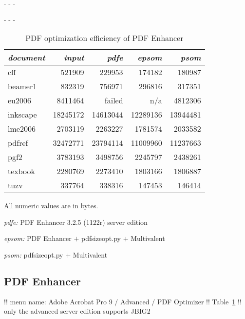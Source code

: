 \documentclass{ltugproc}
\def\cmd{\textsf}
\def\captiontop#1{%
  \advance\abovecaptionskip-\belowcaptionskip
  \advance\belowcaptionskip\abovecaptionskip
  \advance\abovecaptionskip-\belowcaptionskip
  \abovecaptionskip-\abovecaptionskip
  \caption{#1}%
  \advance\abovecaptionskip-\belowcaptionskip
  \advance\belowcaptionskip\abovecaptionskip
  \advance\abovecaptionskip-\belowcaptionskip
  \abovecaptionskip-\abovecaptionskip
}
\begin{document}
\begin{table}
\captiontop{PDF optimization efficiency
of PDF Enhancer}\label{tab:eff-pdfe}
\par\small\noindent\hfil
\advance\tabcolsep-2pt  %
\begin{tabular}{@{}lrrrr@{}}
\toprule
\emph{document} & \emph{input} & \emph{pdfe} & \emph{epsom} & \emph{psom} \\\midrule
cff         &   521909 &   229953 &   174182 &   180987 \\
beamer1     &   832319 &   756971 &   296816 &   317351 \\
eu2006      &  8411464 &  failed  & n/a      &  4812306 \\
inkscape    & 18245172 & 14613044 & 12289136 & 13944481 \\
lme2006     &  2703119 &  2263227 &  1781574 &  2033582 \\
pdfref      & 32472771 & 23794114 & 11009960 & 11237663 \\
pgf2        &  3783193 &  3498756 &  2245797 &  2438261 \\
texbook     &  2280769 &  2273410 &  1803166 &  1806887 \\
tuzv        &   337764 &   338316 &   147453 &   146414 \\
\bottomrule
\end{tabular}
\par\bigskip
\par\noindent All numeric values are in bytes.
\par\noindent\emph{pdfe:} PDF Enhancer 3.2.5 (1122r) server edition
\par\noindent\emph{epsom:} PDF Enhancer $+$ \cmd{pdfsizeopt.py} $+$ Multivalent
\par\noindent\emph{psom:} \cmd{pdfsizeopt.py} $+$ Multivalent
\end{table}


\subsection{PDF Enhancer}

!! menu name: Adobe Acrobat Pro 9 / Advanced / PDF Optimizer
!! Table~\ref{tab:eff-pdfe}
!! only the advanced server edition supports JBIG2
\end{document}
